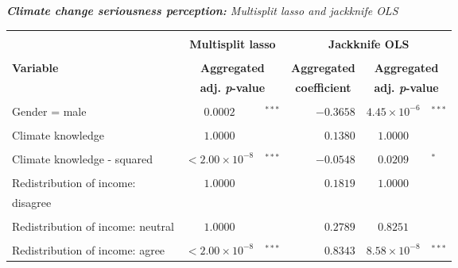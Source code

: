 \documentclass[a4paper,12pt]{article}
\begin{document}
{\centering
\begin{threeparttable}
\singlespacing
\caption{\textit{\textbf{Climate change seriousness perception:} Multisplit lasso and jackknife OLS}}

\label{Climcare435} 
\centering
\begin{small}
\begin{tabular}{lclrcl} 
\hline \vspace{-0.2cm} \\
  \multicolumn{1}{l}{} & \multicolumn{2}{c}{\large{\textbf{Multisplit lasso}}}& \multicolumn{3}{c}{\large{\textbf{Jackknife OLS}}}  \\
  
\vspace{-0.2cm} \\
  \multicolumn{1}{l}{\vspace{0.1cm}\textbf{Variable}} & \multicolumn{2}{c}{\textbf{Aggregated}}& \multicolumn{1}{c}{\textbf{Aggregated}} &  \multicolumn{2}{c}{\textbf{Aggregated}} \\
    \multicolumn{1}{l}{ } & \multicolumn{2}{c}{\textbf{adj. \textit{p}-value}}& \multicolumn{1}{c}{\textbf{coefficient}} &  \multicolumn{2}{c}{\textbf{adj. \textit{p}-value}} \\
 \hline 
\hline
\\
\vspace{-0.2cm}Gender = male&$0.0002$&$^{***}$&$-0.3658$&$4.45\times 10^{-6}$&$^{***}$\\
  \\
\vspace{-0.2cm}Climate knowledge&$1.0000$& &$0.1380$&$1.0000$&\\
  \\
\vspace{-0.2cm}Climate knowledge - squared&$<2.00\times 10^{-8}$&$^{***}$&$-0.0548$&$0.0209$&$^{*}$\\
  \\
 Redistribution of income:&\multirow{2}{*}{$1.0000$}& &\multirow{2}{*}{$0.1819$}&\multirow{2}{*}{$1.0000$}&\\%
      \hspace{0.6cm}disagree\tnote{a}&& &&&\\%
    \\
  \vspace{-0.2cm}Redistribution of income: neutral\tnote{a}&$1.0000$& &$0.2789$&$0.8251$&\\%
    \\
  \vspace{-0.2cm}Redistribution of income: agree\tnote{a}&$<2.00\times 10^{-8}$&$^{***}$&$0.8343$&$8.58\times 10^{-8}$&$^{***}$\\%

\end{tabular}
\end{small}
\end{threeparttable}}
\end{document}
